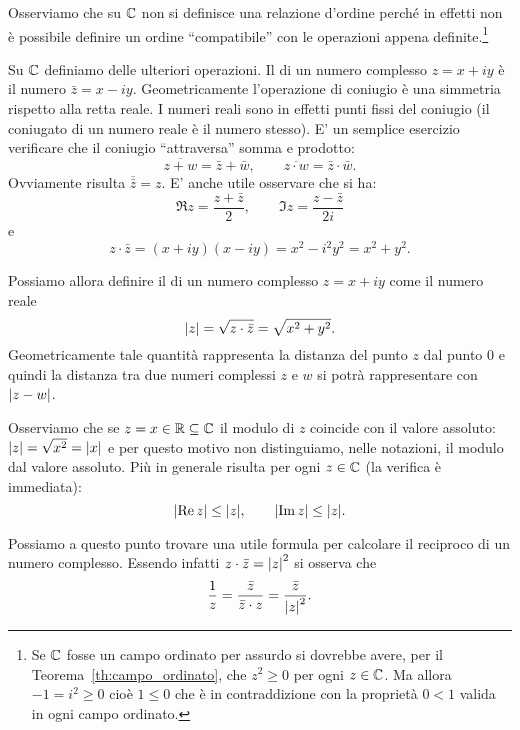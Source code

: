 Osserviamo che su $\mathbb C$ non si definisce una relazione d'ordine perché
in effetti non è possibile definire un ordine ``compatibile'' con le operazioni
appena definite.\footnote{%
Se $\mathbb C$ fosse un campo ordinato per assurdo
si dovrebbe avere,
per il Teorema~\ref{th:campo_ordinato},
che $z^2\ge 0$ per ogni $z\in \mathbb C$. Ma
allora $-1 =i^2 \ge 0$ cioè $1\le 0$ che è in contraddizione
con la proprietà $0<1$ valida in ogni
campo ordinato.
}

Su $\mathbb C$ definiamo delle ulteriori operazioni.
Il 
di un numero complesso $z=x+iy$ è il numero
$\bar z = x - iy$. Geometricamente l'operazione di coniugio è una simmetria
rispetto alla retta reale. I numeri reali sono in effetti punti fissi del
coniugio (il coniugato di un numero reale è il numero stesso).
E' un semplice esercizio verificare che il coniugio ``attraversa''
somma e prodotto:
\[
\overline{z+w} = \bar z + \bar w, \qquad
\overline{z\cdot w} = \bar z \cdot \bar w.
\]
Ovviamente risulta $\overline {\bar z} = z$.
E' anche utile osservare che si ha:
\begin{equation}\label{eq:re_im}
  \Re z = \frac{z+\bar z}{2}, \qquad
  \Im z = \frac{z-\bar z}{2i}
\end{equation}
e
\[
z \cdot \bar z = (x+iy)(x-iy) = x^2-i^2y^2 = x^2+y^2.
\]

Possiamo allora definire il
 di un numero complesso $z=x+iy$
come il numero reale
\[
{\left|z\right|} = \sqrt{z\cdot\bar z} = \sqrt{x^2+y^2}.
\]
Geometricamente tale quantità rappresenta la distanza del punto $z$
dal punto $0$ e quindi la distanza tra due numeri complessi $z$ e
$w$ si potrà rappresentare con ${\left|z-w\right|}$.

Osserviamo che se $z = x \in \mathbb R \subseteq \mathbb C$ il modulo di $z$ coincide
con il valore assoluto: ${\left|z\right|} = \sqrt{x^2} = {\left|x\right|}$ e per questo
motivo non distinguiamo, nelle notazioni, il modulo dal valore assoluto.
Più in generale risulta per ogni $z\in \mathbb C$ (la verifica è immediata):
\[
  {\left|\operatorname{Re} z\right|} \le {\left|z\right|}, \qquad
  {\left|\operatorname{Im}z\right|} \le {\left|z\right|}.
\]

Possiamo a questo punto trovare una utile formula per calcolare
il reciproco di un numero complesso. Essendo infatti
$z\cdot \bar z = {\left|z\right|}^2$ si osserva che
\[
  \frac{1}{z}
  = \frac{\bar z}{ \bar z \cdot z}
  = \frac{\bar z}{{\left|z\right|}^2}.
\]

